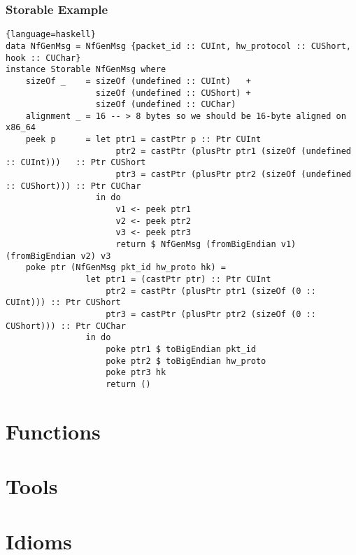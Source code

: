\documentclass{beamer}
\begin{document}
\begin{frame}[fragile]
    \frametitle{Storable Example}
    \begin{lstlisting}{language=haskell}
data NfGenMsg = NfGenMsg {packet_id :: CUInt, hw_protocol :: CUShort, hook :: CUChar}
instance Storable NfGenMsg where
    sizeOf _    = sizeOf (undefined :: CUInt)   +
                  sizeOf (undefined :: CUShort) +
                  sizeOf (undefined :: CUChar)
    alignment _ = 16 -- > 8 bytes so we should be 16-byte aligned on x86_64
    peek p      = let ptr1 = castPtr p :: Ptr CUInt
                      ptr2 = castPtr (plusPtr ptr1 (sizeOf (undefined :: CUInt)))   :: Ptr CUShort
                      ptr3 = castPtr (plusPtr ptr2 (sizeOf (undefined :: CUShort))) :: Ptr CUChar
                  in do
                      v1 <- peek ptr1
                      v2 <- peek ptr2
                      v3 <- peek ptr3
                      return $ NfGenMsg (fromBigEndian v1) (fromBigEndian v2) v3
    poke ptr (NfGenMsg pkt_id hw_proto hk) =
                let ptr1 = (castPtr ptr) :: Ptr CUInt
                    ptr2 = castPtr (plusPtr ptr1 (sizeOf (0 :: CUInt))) :: Ptr CUShort
                    ptr3 = castPtr (plusPtr ptr2 (sizeOf (0 :: CUShort))) :: Ptr CUChar
                in do
                    poke ptr1 $ toBigEndian pkt_id
                    poke ptr2 $ toBigEndian hw_proto
                    poke ptr3 hk
                    return ()
    \end{lstlisting}
\end{frame}

\section{Functions}

\section{Tools}

\section{Idioms}

\begin{frame}
\end{frame}
\end{document}
